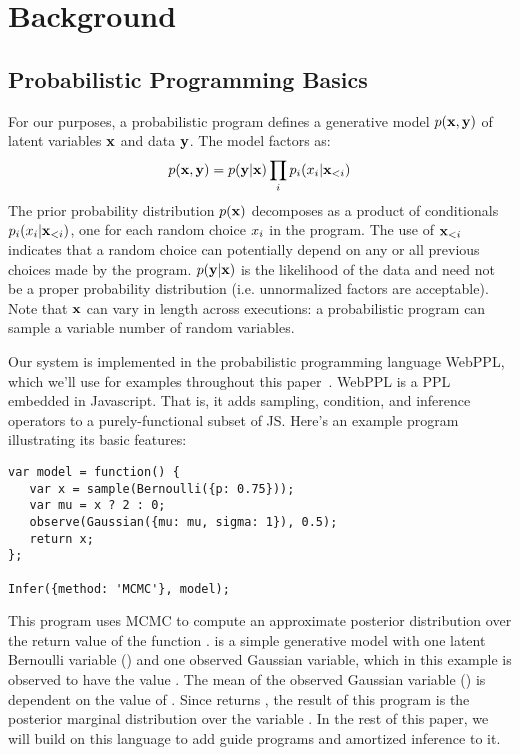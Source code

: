 \section{Background}
\label{sec:background}

\subsection{Probabilistic Programming Basics}
\label{sec:pplbasics}

For our purposes, a probabilistic program defines a generative model $p(\mathbf{x}, \mathbf{y})$ of latent variables $\mathbf{x}$ and data $\mathbf{y}$. The model factors as:
\begin{equation}
p(\mathbf{x}, \mathbf{y}) = p(\mathbf{y} | \mathbf{x}) \prod_i p_i(x_i | \mathbf{x}_{<i})
\label{eq:probProgDef}
\end{equation}
The prior probability distribution $p(\mathbf{x})$ decomposes as a product of conditionals $p_i(x_i | \mathbf{x}_{<i})$, one for each random choice $x_i$ in the program. The use of $\mathbf{x}_{<i}$ indicates that a random choice can potentially depend on any or all previous choices made by the program.
$p(\mathbf{y} | \mathbf{x})$ is the likelihood of the data and need not be a proper probability distribution (i.e. unnormalized factors are acceptable).
Note that $\mathbf{x}$ can vary in length across executions: a probabilistic program can sample a variable number of random variables.

Our system is implemented in the probabilistic programming language WebPPL, which we'll use for examples throughout this paper~\cite{WebPPL}.
WebPPL is a PPL embedded in Javascript.
That is, it adds sampling, condition, and inference operators to a purely-functional subset of JS.
Here's an example program illustrating its basic features:
\begin{lstlisting}
var model = function() {
   var x = sample(Bernoulli({p: 0.75}));
   var mu = x ? 2 : 0;
   observe(Gaussian({mu: mu, sigma: 1}), 0.5);
   return x;
};

Infer({method: 'MCMC'}, model);
\end{lstlisting}
This program uses MCMC to compute an approximate posterior distribution over the return value of the function .  is a simple generative model with one latent Bernoulli variable () and one observed Gaussian variable, which in this example is observed to have the value . The mean of the observed Gaussian variable () is dependent on the value of . Since  returns , the result of this program is the posterior marginal distribution over the variable .
In the rest of this paper, we will build on this language to add guide programs and amortized inference to it.

